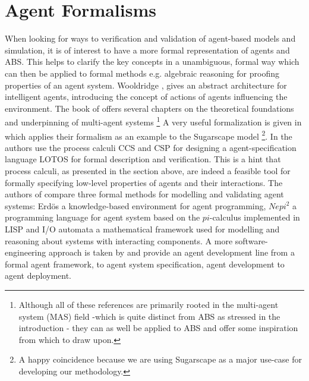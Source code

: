 \section{Agent Formalisms}
When looking for ways to verification and validation of agent-based models and simulation, it is of interest to have a more formal representation of agents and ABS. This helps to clarify the key concepts in a unambiguous, formal way which can then be applied to formal methods e.g. algebraic reasoning for proofing properties of an agent system. Wooldridge \cite{wooldridge_introduction_2009}, \cite{wooldridge_intelligent_1995} gives an abstract architecture for intelligent agents, introducing the concept of actions of agents influencing the environment. The book of \cite{weiss_multiagent_2013} offers several chapters on the theoretical foundations and underpinning of multi-agent systems \footnote{Although all of these references are primarily rooted in the multi-agent system (MAS) field -which is quite distinct from ABS as stressed in the introduction - they can as well be applied to ABS and offer some inspiration from which to draw upon.}
A very useful formalization is given in \cite{klugl_amason:_2013} which applies their formalism as an example to the Sugarscape model \cite{epstein_growing_1996} \footnote{A happy coincidence because we are using Sugarscape as a major use-case for developing our methodology.}.
In \cite{carchiolo_using_2000} the authors use the process calculi CCS and CSP for designing a agent-specification language LOTOS for formal description and verification. This is a hint that process calculi, as presented in the section above, are indeed a feasible tool for formally specifying low-level properties of agents and their interactions.
The authors of \cite{araragi_formal_2000} compare three formal methods for modelling and validating agent systems: Erdös a knowledge-based environment for agent programming, $Nepi^2$ a programming language for agent system based on the $pi$-calculus implemented in LISP and I/O automata a mathematical framework used for modelling and reasoning about systems with interacting components.
A more software-engineering approach is taken by \cite{dinverno_formal_2000} and provide an agent development line from a formal agent framework, to agent system specification, agent development to agent deployment. 